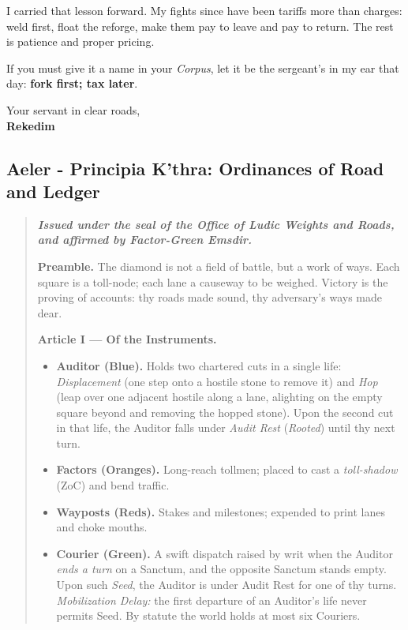 \documentclass[11pt]{article}
\begin{document}
I carried that lesson forward. My fights since have been tariffs more than charges: weld first, float the reforge, make them pay to leave and pay to return. The rest is patience and proper pricing.

\medskip
\noindent If you must give it a name in your \textit{Corpus}, let it be the sergeant's in my ear that day: \textbf{fork first; tax later}.

\medskip
\noindent Your servant in clear roads,\\
\textbf{Rekedim}

\clearpage

\subsection{Aeler - Principia K’thra: Ordinances of Road and Ledger}
\begin{quote}\small\itshape
\textbf{Issued under the seal of the Office of Ludic Weights and Roads, and affirmed by Factor-Green Emsdir.}

\medskip
\textbf{Preamble.} The diamond is not a field of battle, but a work of ways. Each square is a toll-node; each lane a causeway to be weighed. Victory is the proving of accounts: thy roads made sound, thy adversary’s ways made dear.

\medskip
\textbf{Article I — Of the Instruments.}
\begin{itemize}\itemsep0.25em
  \item \textbf{Auditor (Blue).} Holds two chartered cuts in a single life: \emph{Displacement} (one step onto a hostile stone to remove it) and \emph{Hop} (leap over one adjacent hostile along a lane, alighting on the empty square beyond and removing the hopped stone). Upon the second cut in that life, the Auditor falls under \emph{Audit Rest} (\emph{Rooted}) until thy next turn.
  \item \textbf{Factors (Oranges).} Long-reach tollmen; placed to cast a \emph{toll-shadow} (ZoC) and bend traffic.
  \item \textbf{Wayposts (Reds).} Stakes and milestones; expended to print lanes and choke mouths.
  \item \textbf{Courier (Green).} A swift dispatch raised by writ when the Auditor \emph{ends a turn} on a Sanctum, and the opposite Sanctum stands empty. Upon such \emph{Seed}, the Auditor is under Audit Rest for one of thy turns. \emph{Mobilization Delay:} the first departure of an Auditor’s life never permits Seed. By statute the world holds at most six Couriers.
\end{itemize}


\end{quote}
\end{document}
